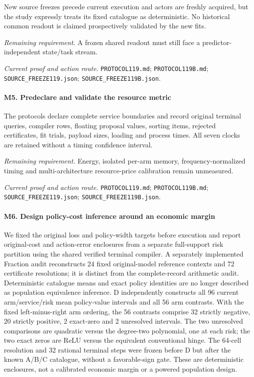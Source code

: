 New source freezes precede current execution and actors are freshly acquired, but the study expressly treats its fixed catalogue as deterministic. No historical common readout is claimed prospectively validated by the new fits.

\par\emph{Remaining requirement.} A frozen shared readout must still face a predictor-independent state/\allowbreak{}task stream.

\par\emph{Current proof and action route.} \nolinkurl{PROTOCOL119.md}; \nolinkurl{PROTOCOL119B.md}; \nolinkurl{SOURCE_FREEZE119.json}; \nolinkurl{SOURCE_FREEZE119B.json}.

\paragraph{M5. Predeclare and validate the resource metric}

The protocols declare complete service boundaries and record original terminal queries, compiler rows, floating proposal values, sorting items, rejected certificates, fit trials, payload sizes, loading and process times. All seven clocks are retained without a timing confidence interval.

\par\emph{Remaining requirement.} Energy, isolated per-arm memory, frequency-normalized timing and multi-architecture resource-price calibration remain unmeasured.

\par\emph{Current proof and action route.} \nolinkurl{PROTOCOL119.md}; \nolinkurl{PROTOCOL119B.md}; \nolinkurl{SOURCE_FREEZE119.json}; \nolinkurl{SOURCE_FREEZE119B.json}.

\paragraph{M6. Design policy-cost inference around an economic margin}

We fixed the original loss and policy-width targets before execution and report original-cost and action-error enclosures from a separate full-support risk partition using the shared verified terminal compiler. A separately implemented Fraction audit reconstructs 24 fixed original-model reference contexts and 72 certificate resolutions; it is distinct from the complete-record arithmetic audit. Deterministic catalogue means and exact policy identities are no longer described as population equivalence inference. D independently constructs all 96 current arm/\allowbreak{}service/\allowbreak{}risk mean policy-value intervals and all 56 arm contrasts. With the fixed left-minus-right arm ordering, the 56 contrasts comprise 32 strictly negative, 20 strictly positive, 2 exact-zero and 2 unresolved intervals. The two unresolved comparisons are quadratic versus the degree-two polynomial, one at each risk; the two exact zeros are ReLU versus the equivalent conventional hinge. The 64-cell resolution and 32 rational terminal steps were frozen before D but after the known A/\allowbreak{}B/\allowbreak{}C catalogue, without a favorable-sign gate. These are deterministic enclosures, not a calibrated economic margin or a powered population design.

